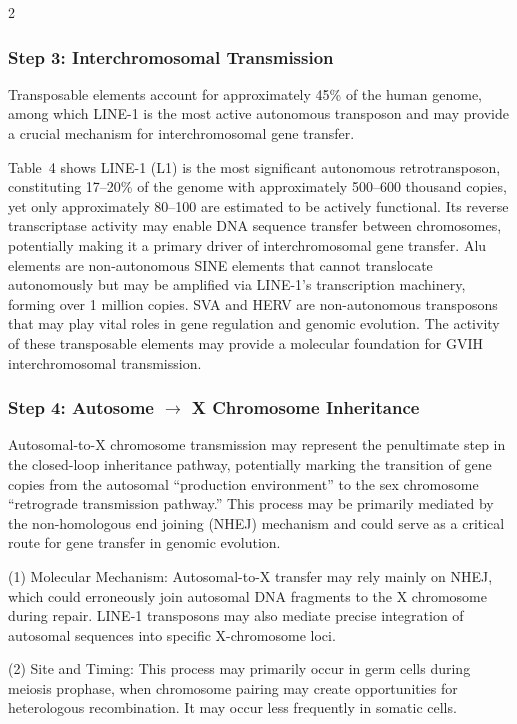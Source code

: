 \documentclass{base}
\begin{document}
\begin{multicols}{2}
\subsubsection{Step 3: Interchromosomal Transmission}
Transposable elements account for approximately 45\% of the human genome, among which LINE-1 is the most active autonomous transposon and may provide a crucial mechanism for interchromosomal gene transfer. 

Table~4 shows LINE-1 (L1) is the most significant autonomous retrotransposon, constituting 17--20\% of the genome with approximately 500--600 thousand copies, yet only approximately 80--100 are estimated to be actively functional. Its reverse transcriptase activity may enable DNA sequence transfer between chromosomes, potentially making it a primary driver of interchromosomal gene transfer. Alu elements are non-autonomous SINE elements that cannot translocate autonomously but may be amplified via LINE-1's transcription machinery, forming over 1 million copies. SVA and HERV are non-autonomous transposons that may play vital roles in gene regulation and genomic evolution. The activity of these transposable elements may provide a molecular foundation for GVIH interchromosomal transmission.





\subsubsection{Step 4: Autosome $\rightarrow$ X Chromosome Inheritance}
Autosomal-to-X chromosome transmission may represent the penultimate step in the closed-loop inheritance pathway, potentially marking the transition of gene copies from the autosomal ``production environment'' to the sex chromosome ``retrograde transmission pathway.'' This process may be primarily mediated by the non-homologous end joining (NHEJ) mechanism and could serve as a critical route for gene transfer in genomic evolution.

(1) Molecular Mechanism: Autosomal-to-X transfer may rely mainly on NHEJ, which could erroneously join autosomal DNA fragments to the X chromosome during repair. LINE-1 transposons may also mediate precise integration of autosomal sequences into specific X-chromosome loci.

(2) Site and Timing: This process may primarily occur in germ cells during meiosis prophase, when chromosome pairing may create opportunities for heterologous recombination. It may occur less frequently in somatic cells.


\end{multicols}
\end{document}
